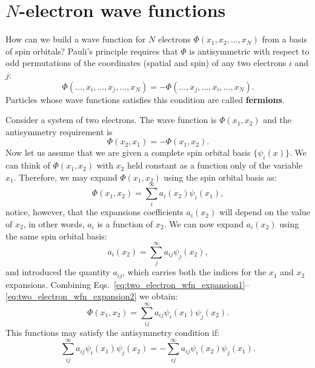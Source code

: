 \documentclass[../Main/chem532-notes.tex]{subfiles}
\begin{document}
\section{$N$-electron wave functions}
How can we build a wave function for $N$ electrons $\Phi(x_1,x_2,\ldots,x_N)$ from a basis of spin orbitals? Pauli's principle requires that $\Phi$ is antisymmetric with respect to odd permutations of the coordinates (spatial and spin) of any two electrons $i$ and $j$:
\begin{equation}
\Phi(\ldots,x_i,\ldots,x_j,\ldots,x_N) = - \Phi(\ldots,x_j,\ldots,x_i,\ldots,x_N).
\end{equation}
Particles whose wave functions satisfies this condition are called \textbf{fermions}.

\begin{example}
Consider a system of two electrons. The wave function is $\Phi(x_1,x_2)$ and the antisymmetry requirement is
\begin{equation}
 \Phi(x_2,x_1) = - \Phi(x_1,x_2).
\end{equation}
Now let us assume that we are given a complete spin orbital basis $\{ \psi_{i}(x) \}$.
We can think of $\Phi(x_1,x_2)$ with $x_2$ held constant as a function only of the variable $x_1$.
Therefore, we may expand $\Phi(x_1,x_2)$ using the spin orbital basis as:
\begin{equation}\label{eq:two_electron_wfn_expansion1}
\Phi(x_1,x_2) = \sum_{i}^{\infty} a_i(x_2) \psi_i(x_1),
\end{equation}
notice, however, that the expansions coefficients $a_i(x_2)$ will depend on the value of $x_2$, in other words, $a_i$ is a function of $x_2$.
We can now expand $a_i(x_2)$ using the same spin orbital basis:
\begin{equation}\label{eq:two_electron_wfn_expansion2}
a_i(x_2) = \sum_{j}^{\infty} a_{ij} \psi_j(x_2),
\end{equation}
and introduced the quantity $a_{ij}$, which carries both the indices for the $x_1$ and $x_2$ expansions.
Combining Eqs.~\eqref{eq:two_electron_wfn_expansion1}--\eqref{eq:two_electron_wfn_expansion2} we obtain:
\begin{equation}
\Phi(x_1,x_2) = \sum_{ij}^{\infty} a_{ij} \psi_i(x_1) \psi_j(x_2).
\end{equation}
This functions may satisfy the antisymmetry condition if:
\begin{equation}
\sum_{ij}^{\infty} a_{ij} \psi_i(x_1) \psi_j(x_2) = -\sum_{ij}^{\infty} a_{ij} \psi_i(x_2) \psi_j(x_1).

\end{equation}
\end{example}
\end{document}
